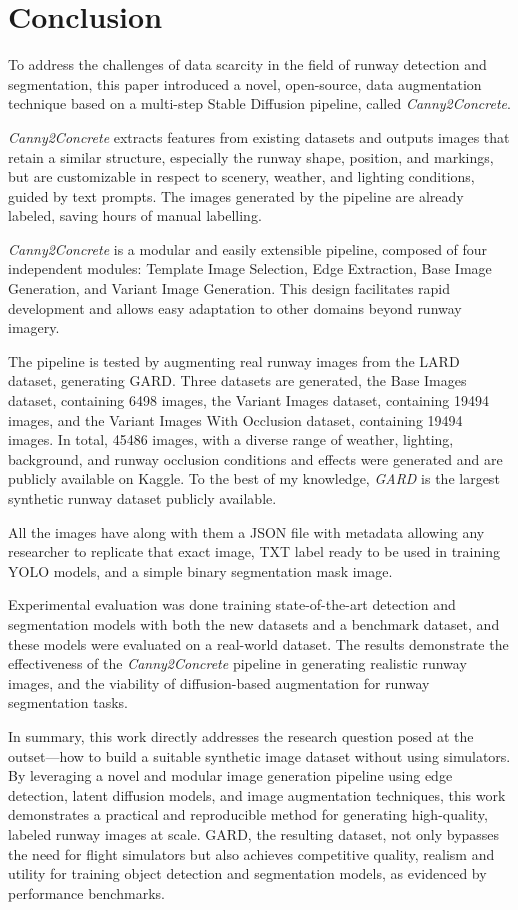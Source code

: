 \chapter{Conclusion}

To address the challenges of data scarcity in the field of runway detection and segmentation,
this paper introduced a novel, open-source, data augmentation technique based on a multi-step
Stable Diffusion pipeline, called \emph{Canny2Concrete}.

\emph{Canny2Concrete} extracts features from existing datasets and outputs images
that retain a similar structure, especially the runway shape, position, and markings, but are
customizable in respect to scenery, weather, and lighting conditions, guided by
text prompts. The images generated by the pipeline are already
labeled, saving hours of manual labelling.

\emph{Canny2Concrete} is a modular and easily extensible pipeline, composed of four
independent modules: Template Image Selection, Edge Extraction, Base Image Generation,
and Variant Image Generation. This design facilitates rapid development and
allows easy adaptation to other domains beyond runway imagery.

The pipeline is tested by augmenting real runway images from the LARD \cite{ducoffe_lard_2023}
dataset, generating \ac{GARD}. Three datasets are generated, the Base Images dataset,
containing 6498 images, the Variant Images dataset, containing 19494 images, and
the Variant Images With Occlusion dataset, containing 19494 images. In total,
45486 images, with a diverse range of weather, lighting, background, and runway
occlusion conditions and effects were generated and are publicly available on Kaggle.
To the best of my knowledge, \emph{GARD} is the largest synthetic runway
dataset publicly available.

All the images have along with them a JSON file
with metadata allowing any researcher to replicate that exact image, TXT label
ready to be used in training YOLO models, and a simple binary segmentation mask
image. 

Experimental evaluation was done training state-of-the-art detection and
segmentation models with both the new datasets and a benchmark dataset, and
these models were evaluated on a real-world dataset. The results demonstrate
the effectiveness of the \emph{Canny2Concrete} pipeline in generating realistic runway
images, and the viability of diffusion-based augmentation for runway segmentation
tasks.

In summary, this work directly addresses the research question posed at the
outset—how to build a suitable synthetic image dataset without using simulators.
By leveraging a novel and modular image generation pipeline using edge
detection, latent diffusion models, and image augmentation techniques, this work
demonstrates a practical and reproducible method for generating high-quality,
labeled runway images at scale. \ac{GARD}, the resulting dataset, not only bypasses the need
for flight simulators but also achieves competitive quality, realism and utility for
training object detection and segmentation models, as evidenced by performance
benchmarks.

